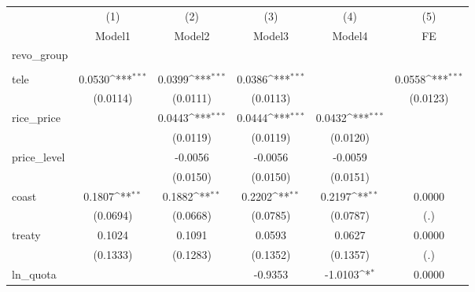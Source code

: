 {
\def\sym#1{\ifmmode^{#1}\else\(^{#1}\)\fi}
\begin{tabular}{l*{5}{c}}
\toprule
            &\multicolumn{1}{c}{(1)}&\multicolumn{1}{c}{(2)}&\multicolumn{1}{c}{(3)}&\multicolumn{1}{c}{(4)}&\multicolumn{1}{c}{(5)}\\
            &\multicolumn{1}{c}{Model1}&\multicolumn{1}{c}{Model2}&\multicolumn{1}{c}{Model3}&\multicolumn{1}{c}{Model4}&\multicolumn{1}{c}{FE}\\
\midrule
revo\_group  &                     &                     &                     &                     &                     \\
            &                     &                     &                     &                     &                     \\
tele        &      0.0530\sym{***}&      0.0399\sym{***}&      0.0386\sym{***}&                     &      0.0558\sym{***}\\
            &    (0.0114)         &    (0.0111)         &    (0.0113)         &                     &    (0.0123)         \\
rice\_price  &                     &      0.0443\sym{***}&      0.0444\sym{***}&      0.0432\sym{***}&                     \\
            &                     &    (0.0119)         &    (0.0119)         &    (0.0120)         &                     \\
price\_level &                     &     -0.0056         &     -0.0056         &     -0.0059         &                     \\
            &                     &    (0.0150)         &    (0.0150)         &    (0.0151)         &                     \\
coast       &      0.1807\sym{**} &      0.1882\sym{**} &      0.2202\sym{**} &      0.2197\sym{**} &      0.0000         \\
            &    (0.0694)         &    (0.0668)         &    (0.0785)         &    (0.0787)         &         (.)         \\
treaty      &      0.1024         &      0.1091         &      0.0593         &      0.0627         &      0.0000         \\
            &    (0.1333)         &    (0.1283)         &    (0.1352)         &    (0.1357)         &         (.)         \\
ln\_quota    &                     &                     &     -0.9353         &     -1.0103\sym{*}  &      0.0000         \\

\end{tabular}}
